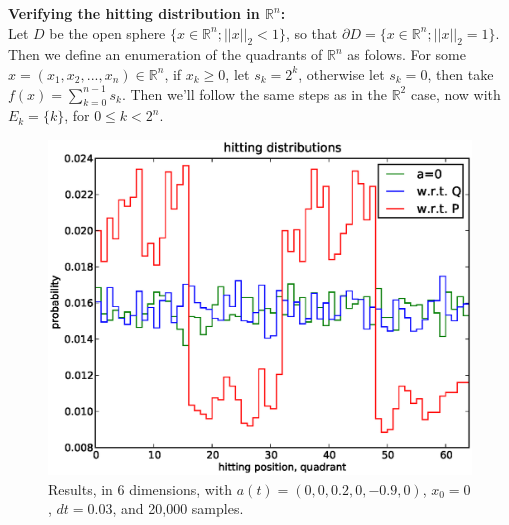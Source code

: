 \documentclass[12pt]{article}
\newcommand{\reals}[0] { \mathbb{R}}
\begin{document}
{\bf Verifying the hitting distribution in $\reals^n$:}  \\

Let $D$ be the open sphere $\{x \in \reals^n; ||x||_2 < 1 \}$, so that $\partial D = \{ x \in \reals^n; ||x||_2 = 1 \}$. Then we define an enumeration of the quadrants of $\reals^n$  as folows. For some $x = (x_1, x_2, ..., x_n) \in \reals^n$, if $x_k \ge 0$, let $s_k=2^k$, otherwise let $s_k=0$, then take $f(x) = \sum_{k=0}^{n-1} s_k$. Then we'll follow the same steps as in the $\reals^2$ case, now with $E_k = \{ k \}$, for $0 \le k < 2^n$. \\


\begin{figure}[h]
\begin{center}
\includegraphics[width=5in]{figure5.eps}
\end{center}
\caption{Results, in 6 dimensions, with $a(t) = (0,0,0.2,0,-0.9,0)$, $x_0 = 0$, $dt=0.03$, and 20,000 samples.}
\end{figure}







\break
\end{document}
